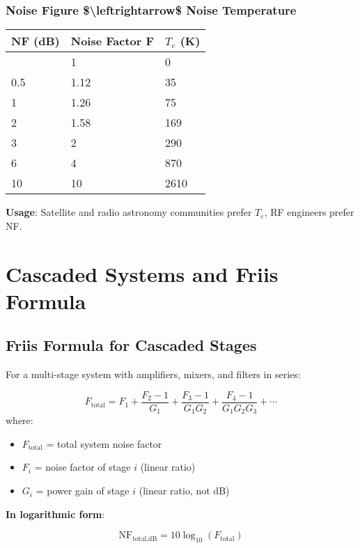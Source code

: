 \subsubsection{Noise Figure \$\textbackslash leftrightarrow\$ Noise
Temperature}\label{noise-figure-noise-temperature}

{\def\LTcaptype{} %
\begin{longtable}[]{@{}lll@{}}
\toprule\noalign{}
NF (dB) & Noise Factor F & \(T_e\) (K) \\
\midrule\noalign{}
\endhead
\bottomrule\noalign{}
\endlastfoot
0 & 1 & 0 \\
0.5 & 1.12 & 35 \\
1 & 1.26 & 75 \\
2 & 1.58 & 169 \\
3 & 2 & 290 \\
6 & 4 & 870 \\
10 & 10 & 2610 \\
\end{longtable}
}

\textbf{Usage}: Satellite and radio astronomy communities prefer $T_e$, RF engineers prefer NF.

\section{Cascaded Systems and Friis Formula}

\subsection{Friis Formula for Cascaded Stages}

For a multi-stage system with amplifiers, mixers, and filters in series:

\begin{equation}
F_{\text{total}} = F_1 + \frac{F_2 - 1}{G_1} + \frac{F_3 - 1}{G_1 G_2} + \frac{F_4 - 1}{G_1 G_2 G_3} + \cdots
\end{equation}
where:
\begin{itemize}
\item $F_{\text{total}}$ = total system noise factor
\item $F_i$ = noise factor of stage $i$ (linear ratio)
\item $G_i$ = power gain of stage $i$ (linear ratio, not dB)
\end{itemize}

\textbf{In logarithmic form}:

\begin{equation}
\text{NF}_{\text{total,dB}} = 10\log_{10}(F_{\text{total}})
\end{equation}

